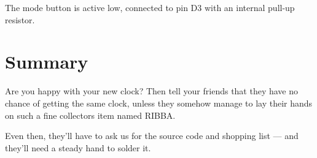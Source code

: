 \documentclass[a4paper,10pt,twocolumn]{article}
\begin{document}
The mode button is active low, connected to pin D3 with an internal pull-up resistor.

\section{Summary}
Are you happy with your new clock? Then tell your friends that they have no chance of getting 
the same clock, unless they somehow manage to lay their hands on such a fine collectors 
item named RIBBA.

Even then, they'll have to ask us for the source code and shopping list --- and they'll need a 
steady hand to solder it.
\end{document}
